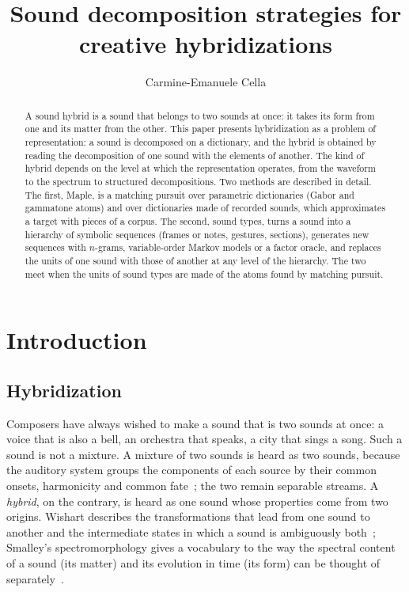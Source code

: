\documentclass[11pt,a4paper]{article}
\title{Sound decomposition strategies for creative hybridizations}
\author{Carmine-Emanuele Cella}
\date{}
\begin{document}
\maketitle

\begin{abstract}
A sound hybrid is a sound that belongs to two sounds at once: it takes its
form from one and its matter from the other. This paper presents hybridization
as a problem of representation: a sound is decomposed on a dictionary,
and the hybrid is obtained by reading the decomposition of one sound with the
elements of another. The kind of hybrid depends on the level at which the
representation operates, from the waveform to the spectrum to structured
decompositions. Two methods are described in detail. The first, Maple, is a
matching pursuit over parametric dictionaries (Gabor and gammatone atoms) and
over dictionaries made of recorded sounds, which approximates a target with
pieces of a corpus. The second, sound types, turns a sound into a hierarchy
of symbolic sequences (frames or notes, gestures, sections), generates new
sequences with $n$-grams, variable-order Markov models or a factor oracle, and
replaces the units of one sound with those of another at any level of the
hierarchy. The two meet when the units of sound types are made of the atoms
found by matching pursuit.
\end{abstract}

\section{Introduction}

\subsection{Hybridization}

Composers have always wished to make a sound that is two sounds at once: a
voice that is also a bell, an orchestra that speaks, a city that sings a
song. Such a sound is not a mixture. A mixture of two sounds is heard as two
sounds, because the auditory system groups the components of each source by
their common onsets, harmonicity and common fate~\cite{bregman1990}; the two
remain separable streams. A \emph{hybrid}, on the contrary, is heard as one
sound whose properties come from two origins. Wishart describes the
transformations that lead from one sound to another and the intermediate
states in which a sound is ambiguously both~\cite{wishart1994}; Smalley's
spectromorphology gives a vocabulary to the way the spectral content of a
sound (its matter) and its evolution in time (its form) can be thought of
separately~\cite{smalley1997}.
\end{document}
